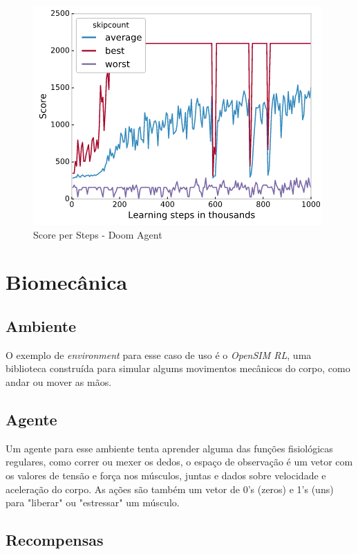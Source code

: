 \documentclass[12pt]{article}
\begin{document}
\begin{figure}[H]
    \centering
    \includegraphics[scale=.8]{src/img/score-doom.png}
    \caption{Score per Steps - Doom Agent}
\end{figure}

\pagebreak

\section{Biomecânica}

\subsection{Ambiente}

O exemplo de \textit{environment} para esse caso de uso é o \textit{OpenSIM RL}\cite{osimrl}, uma biblioteca construída para simular algums movimentos mecânicos do corpo, como andar ou mover as mãos.

\subsection{Agente}

Um agente para esse ambiente tenta aprender alguma das funções fisiológicas regulares, como correr ou mexer os dedos, o espaço de observação é um vetor com os valores de tensão e força nos músculos, juntas e dados sobre velocidade e aceleração do corpo. As ações são também um vetor de 0's (zeros) e 1's (uns) para "liberar" ou "estressar" um músculo.

\subsection{Recompensas}
\end{document}
